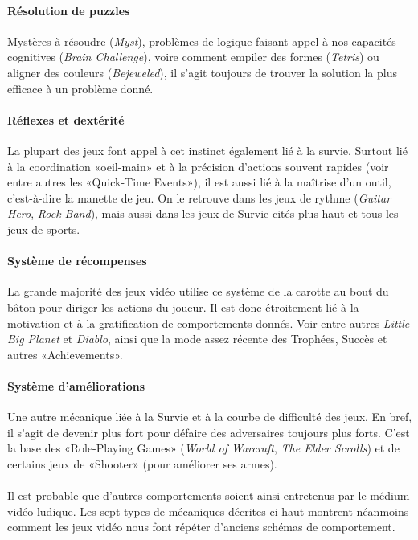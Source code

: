 		\paragraph{Résolution de puzzles \\ \quad}
Mystères à résoudre (\emph{Myst}), problèmes de logique faisant appel à nos capacités cognitives (\emph{Brain Challenge}), voire comment empiler des formes (\emph{Tetris}) ou aligner des couleurs (\emph{Bejeweled}), il s’agit toujours de trouver la solution la plus efficace à un problème donné.
		\paragraph{Réflexes et dextérité \\ \quad}
La plupart des jeux font appel à cet instinct également lié à la survie.
Surtout lié à la coordination «oeil-main» et à la précision d’actions souvent rapides (voir entre autres les «Quick-Time Events»), il est aussi lié à la maîtrise d’un outil, c’est-à-dire la manette de jeu. On le retrouve dans les jeux de rythme (\emph{Guitar Hero}, \emph{Rock Band}), mais aussi dans les jeux de Survie cités plus haut et tous les jeux de sports.
		\paragraph{Système de récompenses \\ \quad}
La grande majorité des jeux vidéo utilise ce système de la carotte au bout du bâton pour diriger les actions du joueur. Il est donc étroitement lié à la motivation et à la gratification de comportements donnés. Voir entre autres \emph{Little Big Planet} et \emph{Diablo}, ainsi que la mode assez récente des Trophées, Succès et autres «Achievements».
		\paragraph{Système d’améliorations \\ \quad}
Une autre mécanique liée à la Survie et à la courbe de difficulté des jeux. En bref, il s’agit de devenir plus fort pour défaire des adversaires toujours plus forts. C’est la base des «Role-Playing Games» (\emph{World of Warcraft}, \emph{The Elder Scrolls}) et de certains jeux de «Shooter» (pour améliorer ses armes).

		\paragraph{}
Il est probable que d’autres comportements soient ainsi entretenus par le médium vidéo-ludique. Les sept types de mécaniques décrites ci-haut montrent néanmoins comment les jeux vidéo nous font répéter d’anciens schémas de comportement.

